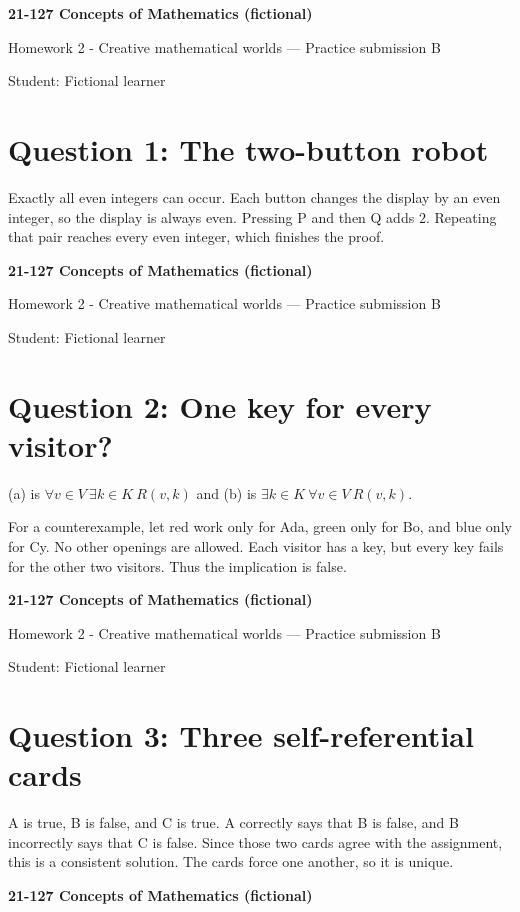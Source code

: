 \documentclass[11pt]{article}
\begin{document}
\textbf{21-127 Concepts of Mathematics (fictional)}

Homework 2 - Creative mathematical worlds --- Practice submission B

Student: Fictional learner

\section*{Question 1: The two-button robot}

Exactly all even integers can occur. Each button changes the display by an even integer, so the display is always even. Pressing P and then Q adds $2$. Repeating that pair reaches every even integer, which finishes the proof.

\newpage
\textbf{21-127 Concepts of Mathematics (fictional)}

Homework 2 - Creative mathematical worlds --- Practice submission B

Student: Fictional learner

\section*{Question 2: One key for every visitor?}

(a) is $\forall v\in V\ \exists k\in K\ R(v,k)$ and (b) is $\exists k\in K\ \forall v\in V\ R(v,k)$.

For a counterexample, let red work only for Ada, green only for Bo, and blue only for Cy. No other openings are allowed. Each visitor has a key, but every key fails for the other two visitors. Thus the implication is false.

\newpage
\textbf{21-127 Concepts of Mathematics (fictional)}

Homework 2 - Creative mathematical worlds --- Practice submission B

Student: Fictional learner

\section*{Question 3: Three self-referential cards}

A is true, B is false, and C is true. A correctly says that B is false, and B incorrectly says that C is false. Since those two cards agree with the assignment, this is a consistent solution. The cards force one another, so it is unique.

\newpage
\textbf{21-127 Concepts of Mathematics (fictional)}
\end{document}
